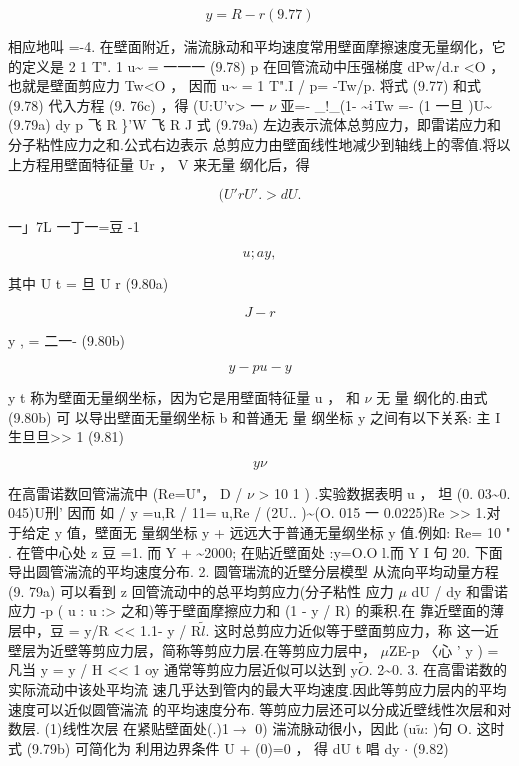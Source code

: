 \[y = R-r (9.7 7)\]

相应地叫 =-4. 在壁面附近，湍流脉动和平均速度常用壁面摩擦速度无量纲化，它 的定义是 2 1 T". 1 u\textasciitilde{} = 一一一 (9.78) p 在回管流动中压强梯度 dPw/d.r <O ，也就是壁面剪应力 Tw<O ， 因而 u\textasciitilde{} = 1 T".I / p= -Tw/p. 将式 (9.77) 和式 (9.78) 代入方程 (9. 76c) ，得 (U:U'v> 一 $\nu$ 亚=- \_!\_(1- \textasciitilde{}${\rm i}$Tw =- (1 一旦 )U\textasciitilde{} (9.79a) dy p 飞 R \}'W 飞 R J 式 (9.79a) 左边表示流体总剪应力，即雷诺应力和分子粘性应力之和.公式右边表示 总剪应力由壁面线性地减少到轴线上的零值.将以上方程用壁面特征量 Ur ， V 来无量 纲化后，得

\[(U'rU'.> dU.\]

一」7L 一丁一=豆 -1

\begin{equation*}u; ay ,\tag{9.79b}\end{equation*}

其中 U t = 旦 U r (9.80a)

\[J-r\]

y , = 二一- (9.80b)

\begin{equation*}y-pu -y\tag{9.80c}\end{equation*}

y t 称为壁面无量纲坐标，因为它是用壁面特征量 u ， 和 $\nu$ 无 量 纲化的.由式 (9.80b) 可 以导出壁面无量纲坐标 b 和普通无 量 纲坐标 y 之间有以下关系: 主 I 生旦旦>> 1 (9.81)

\[y\nu \]

在高雷诺数回管湍流中 (Re=U"， D / $\nu$ > 10 1 ) .实验数据表明 u ， 坦 (0. 03\textasciitilde{}0. 045)U刑' 因而 如 / y =u,R / 11= u,Re / (2U.. )\textasciitilde{}(O. 015 一 0.0225)Re >> 1.对于给定 y 值，壁面无 量纲坐标 y + 远远大于普通无量纲坐标 y 值.例如: Re= 10 " . 在管中心处 z 豆 =1. 而 Y + \textasciitilde{}2000; 在贴近壁面处 :y=O.O l.而 Y I 句 20. 下面导出圆管湍流的平均速度分布. 2. 圆管瑞流的近壁分层模型 从流向平均动量方程 (9. 79a) 可以看到 z 回管流动中的总平均剪应力(分子粘性 应力 $\mu$ dU / dy 和雷诺应力 -p ( u : u :> 之和)等于壁面摩擦应力和 (1 - y / R) 的乘积.在 靠近壁面的薄层中，豆 = y/R << 1.1- y / R$\tilde{l}$. 这时总剪应力近似等于壁面剪应力，称 这一近壁层为近壁等剪应力层，简称等剪应力层.在等剪应力层中， $\mu$ZE-p 〈心 ' y ) = 凡当 y = y / H << 1 oy 通常等剪应力层近似可以达到 y$\tilde{O}$. 2\textasciitilde{}0. 3. 在高雷诺数的实际流动中该处平均流 速几乎达到管内的最大平均速度.因此等剪应力层内的平均速度可以近似圆管湍流 的平均速度分布. 等剪应力层还可以分成近壁线性次层和对数层. (1)线性次层 在紧贴壁面处(.)1$\rightarrow$ 0) 湍流脉动很小，因此 (u$\tilde{u}$: )句 O. 这时式 (9.79b) 可简化为 利用边界条件 U + (0)=0 ， 得 dU t 唱 dy  $\cdot $ (9.82)

